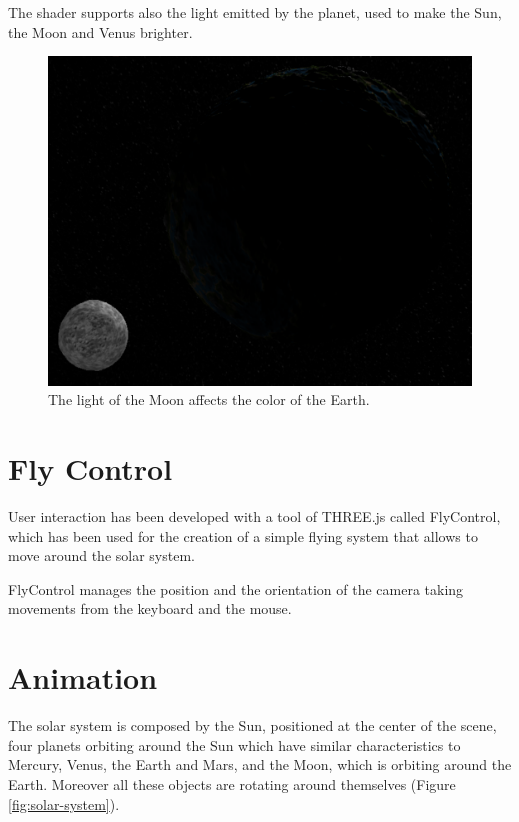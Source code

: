 \documentclass[paper=a4, fontsize=11pt]{scrartcl} %
\numberwithin{equation}{section} %
\numberwithin{figure}{section} %
\numberwithin{table}{section} %
\theoremstyle{definition}
\begin{document}
The shader supports also the light emitted by the planet, used to make the Sun,
the Moon and Venus brighter.

\begin{figure}
	\centering
	\includegraphics[scale=0.25]{images/earth_moon.png}
	\caption{The light of the Moon affects the color of the Earth.}
	\label{fig:earth-moon-light}
\end{figure}


\section{Fly Control}

User interaction has been developed with a tool of THREE.js called FlyControl,
which has been used for the creation of a simple flying system that allows to
move around the solar system.

FlyControl manages the position and the orientation of the camera taking
movements from the keyboard and the mouse.


\section{Animation}

The solar system is composed by the Sun, positioned at the center of the scene,
four planets orbiting around the Sun which have similar characteristics to
Mercury, Venus, the Earth and Mars, and the Moon, which is orbiting around the
Earth. Moreover all these objects are rotating around themselves (Figure
\ref{fig:solar-system}).
\end{document}
